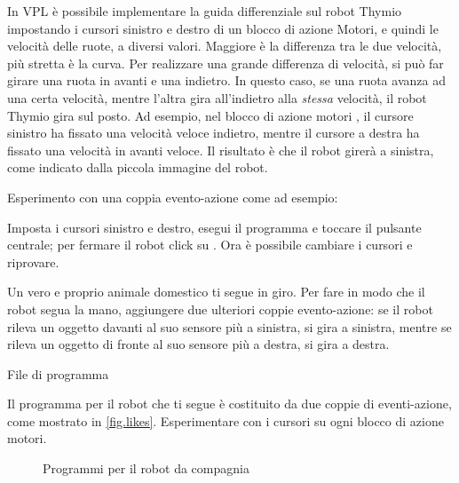 In VPL è possibile implementare la guida differenziale sul robot Thymio
impostando i cursori sinistro e destro di un blocco di azione Motori, e quindi le velocità delle ruote, a
diversi valori.
Maggiore è la differenza tra le due velocità, più stretta è la curva. Per
realizzare una grande differenza di velocità, si può far girare una ruota in avanti
e una indietro. In questo caso, se una ruota avanza ad una
certa velocità, mentre l'altra gira all'indietro alla \emph{stessa}
velocità, il robot Thymio gira sul posto.
Ad esempio, nel blocco di azione motori , il cursore sinistro ha
fissato una velocità veloce indietro, mentre il cursore a destra ha fissato
una velocità in avanti veloce.
Il risultato è che il robot girerà a sinistra, come indicato dalla piccola immagine del robot.

Esperimento con una coppia evento-azione come ad esempio: 

Imposta i cursori sinistro e destro, esegui il programma
e toccare il pulsante centrale; per fermare il robot click su .
Ora è possibile cambiare i cursori e riprovare.




Un vero e proprio animale domestico ti segue in giro. Per fare in modo che il robot segua la mano, aggiungere
due ulteriori coppie evento-azione: se il robot rileva un oggetto davanti al suo sensore più a sinistra, si gira a sinistra, mentre se rileva
un oggetto di fronte al suo sensore più a destra, si gira a destra.


{\raggedleft \hfill File di programma }

Il programma per il robot che ti segue è costituito da due coppie di eventi-azione, come mostrato in \cref{fig.likes}.
Esperimentare con i cursori su ogni blocco di azione motori.

\begin{figure}
	\hfill
	\caption{Programmi per il robot da compagnia}
\end{figure}


